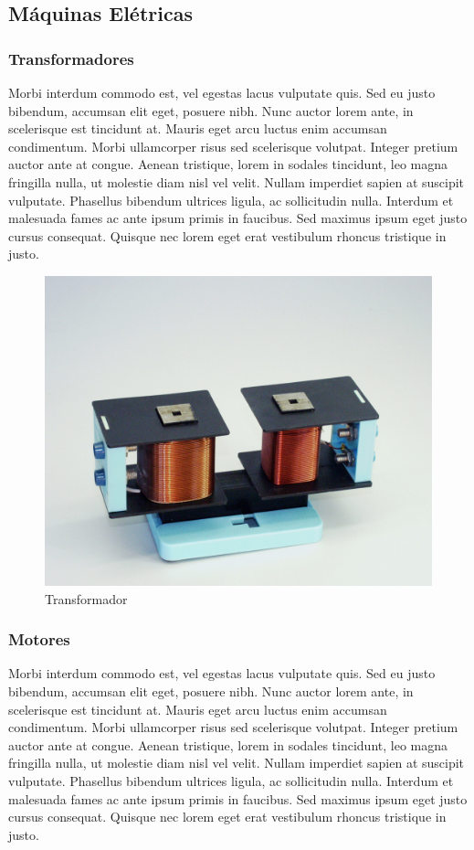 \subsection{Máquinas Elétricas}
\subsubsection{Transformadores}
Morbi interdum commodo est, vel egestas lacus vulputate quis. Sed eu justo bibendum, accumsan elit eget, posuere nibh. Nunc auctor lorem ante, in scelerisque est tincidunt at. Mauris eget arcu luctus enim accumsan condimentum. Morbi ullamcorper risus sed scelerisque volutpat. Integer pretium auctor ante at congue. Aenean tristique, lorem in sodales tincidunt, leo magna fringilla nulla, ut molestie diam nisl vel velit. Nullam imperdiet sapien at suscipit vulputate. Phasellus bibendum ultrices ligula, ac sollicitudin nulla. Interdum et malesuada fames ac ante ipsum primis in faucibus. Sed maximus ipsum eget justo cursus consequat. Quisque nec lorem eget erat vestibulum rhoncus tristique in justo.

\begin{figure}[!htb]
    \centering
    \includegraphics[scale=0.2]{Trafo_3.jpg}
    \caption{Transformador}
    \label{trafo}
\end{figure}

\subsubsection{Motores}
Morbi interdum commodo est, vel egestas lacus vulputate quis. Sed eu justo bibendum, accumsan elit eget, posuere nibh. Nunc auctor lorem ante, in scelerisque est tincidunt at. Mauris eget arcu luctus enim accumsan condimentum. Morbi ullamcorper risus sed scelerisque volutpat. Integer pretium auctor ante at congue. Aenean tristique, lorem in sodales tincidunt, leo magna fringilla nulla, ut molestie diam nisl vel velit. Nullam imperdiet sapien at suscipit vulputate. Phasellus bibendum ultrices ligula, ac sollicitudin nulla. Interdum et malesuada fames ac ante ipsum primis in faucibus. Sed maximus ipsum eget justo cursus consequat. Quisque nec lorem eget erat vestibulum rhoncus tristique in justo.